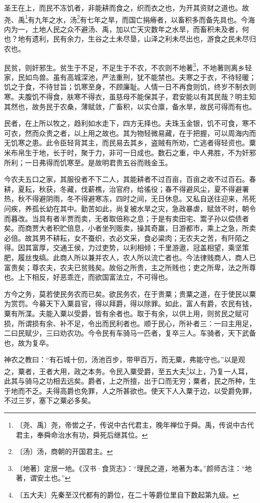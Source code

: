 \documentclass[12pt,UTF-8,openany,a4]{ctexbook}
\begin{document}
\begin{large}
    
    圣王在上，而民不冻饥者，非能耕而食之，织而衣之也，为开其资财之道也。故尧、禹\footnote{〔尧、禹〕\yiwen 尧，帝喾之子，传说中古代君主，晚年禅位于舜。禹，传说中古代君主，奉舜命治水有功，舜死后继其位。}有九年之水，汤\footnote{〔汤〕\yiwen 汤，商朝的开国君主。}有七年之旱，而国亡捐瘠者，以畜积多而备先具也。今海内为一，土地人民之众不避汤、禹，加以亡天灾数年之水旱，而畜积未及者，何也？地有遗利，民有余力，生谷之土未尽垦，山泽之利未尽出也，游食之民未尽归农也。
    
    民贫，则奸邪生。贫生于不足，不足生于不农，不农则不地著\footnote{〔地著〕\yiwen 定居一地。《汉书·食货志》：“理民之道，地著为本。”颜师古注：“地著，谓安土也。”}，不地著则离乡轻家，民如鸟兽。虽有高城深池，严法重刑，犹不能禁也。夫寒之于衣，不待轻暖；饥之于食，不待甘旨；饥寒至身，不顾廉耻。人情一日不再食则饥，终岁不制衣则寒。夫腹饥不得食，肤寒不得衣，虽慈母不能保其子，君安能以有其民哉？明主知其然也，故务民于农桑，薄赋敛，广畜积，以实仓廪，备水旱，故民可得而有也。
    
    民者，在上所以牧之，趋利如水走下，四方无择也。夫珠玉金银，饥不可食，寒不可衣，然而众贵之者，以上用之故也。其为物轻微易藏，在于把握，可以周海内而无饥寒之患。此令臣轻背其主，而民易去其乡，盗贼有所劝，亡逃者得轻资也。粟米布帛生于地，长于时，聚于力，非可一日成也。数石之重，中人弗胜，不为奸邪所利；一日弗得而饥寒至。是故明君贵五谷而贱金玉。
    
    今农夫五口之家，其服役者不下二人，其能耕者不过百亩，百亩之收不过百石。春耕，夏耘，秋获，冬藏，伐薪樵，治官府，给徭役；春不得避风尘，夏不得避署热，秋不得避阴雨，冬不得避寒冻，四时之间，无日休息。又私自送往迎来，吊死问疾，养孤长幼在其中。勤苦如此，尚复被水旱之灾，急政暴虐，赋敛不时，朝令而暮改。当具有者半贾而卖，无者取倍称之息；于是有卖田宅、鬻子孙以偿债者矣。而商贾大者积贮倍息，小者坐列贩卖，操其奇赢，日游都市，乘上之急，所卖必倍。故其男不耕耘，女不蚕织，衣必文采，食必粱肉；无农夫之苦，有阡陌之得。因其富厚，交通王侯，力过吏势，以利相倾；千里游遨，冠盖相望，乘坚策肥，履丝曳缟。此商人所以兼并农人，农人所以流亡者也。今法律贱商人，商人已富贵矣；尊农夫，农夫已贫贱矣。故俗之所贵，主之所贱也；吏之所卑，法之所尊也。上下相反，好恶乖迕，而欲国富法立，不可得也。
    
    方今之务，莫若使民务农而已矣。欲民务农，在于贵粟；贵粟之道，在于使民以粟为赏罚。今募天下入粟县官，得以拜爵，得以除罪。如此，富人有爵，农民有钱，粟有所渫。夫能入粟以受爵，皆有余者也。取于有余，以供上用，则贫民之赋可损，所谓损有余、补不足，令出而民利者也。顺于民心，所补者三：一曰主用足，二曰民赋少，三曰劝农功。今令民有车骑马一匹者，复卒三人。车骑者，天下武备也，故为复卒。
    
    神农之教曰：“有石城十仞，汤池百步，带甲百万，而无粟，弗能守也。”以是观之，粟者，王者大用，政之本务。令民入粟受爵，至五大夫\footnote{〔五大夫〕\yiwen 先秦至汉代都有的爵位，在二十等爵位里自下数起第九级。}以上，乃复一人耳，此其与骑马之功相去远矣。爵者，上之所擅，出于口而无穷；粟者，民之所种，生于地而不乏。夫得高爵也免罪，人之所甚欲也。使天下人入粟于边，以受爵免罪，不过三岁，塞下之粟必多矣。

\end{large}
\end{document}
